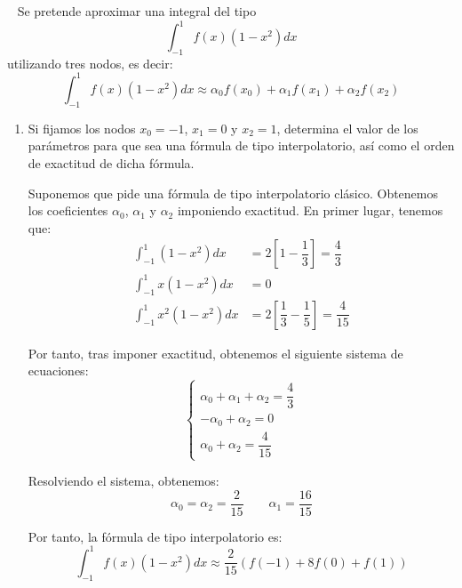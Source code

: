 \begin{ejercicio}~\label{ej:2.3.4}
    Se pretende aproximar una integral del tipo
    \begin{equation*}
        \int_{-1}^{1} f(x)(1 - x^2)dx
    \end{equation*}
    utilizando tres nodos, es decir:
    \begin{equation*}
        \int_{-1}^{1} f(x)(1 - x^2)dx \approx \alpha_0 f(x_0) + \alpha_1 f(x_1) + \alpha_2 f(x_2)
    \end{equation*}
    \begin{enumerate}
        \item\label{ap:1} Si fijamos los nodos $x_0 = -1$, $x_1 = 0$ y $x_2 = 1$, determina el valor de los parámetros para que sea una fórmula de tipo interpolatorio, así como el orden de exactitud de dicha fórmula.
        
        Suponemos que pide una fórmula de tipo interpolatorio clásico. Obtenemos los coeficientes $\alpha_0$, $\alpha_1$ y $\alpha_2$ imponiendo exactitud. En primer lugar, tenemos que:
        \begin{align*}
            \int_{-1}^{1} (1 - x^2)dx &= 2\left[1 - \dfrac{1}{3}\right] = \dfrac{4}{3}\\
            \int_{-1}^{1} x(1 - x^2)dx &= 0\\
            \int_{-1}^{1} x^2(1 - x^2)dx &= 2\left[\dfrac{1}{3} - \dfrac{1}{5}\right] = \dfrac{4}{15}
        \end{align*}

        Por tanto, tras imponer exactitud, obtenemos el siguiente sistema de ecuaciones:
        \begin{equation*}
            \begin{cases}
                \alpha_0 + \alpha_1 + \alpha_2 = \dfrac{4}{3}\\
                -\alpha_0 + \alpha_2 = 0\\
                \alpha_0 + \alpha_2 = \dfrac{4}{15}
            \end{cases}
        \end{equation*}

        Resolviendo el sistema, obtenemos:
        \begin{equation*}
            \alpha_0 = \alpha_2 = \dfrac{2}{15}\qquad \alpha_1 = \dfrac{16}{15}
        \end{equation*}

        Por tanto, la fórmula de tipo interpolatorio es:
        \begin{equation*}
            \int_{-1}^{1} f(x)(1 - x^2)dx \approx \dfrac{2}{15}\left(f(-1) + 8f(0) + f(1)\right)
        \end{equation*}


\end{enumerate}
\end{ejercicio}
